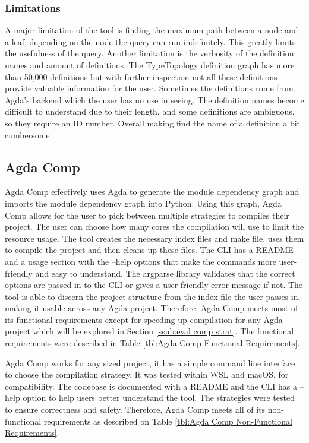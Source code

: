 \subsubsection{Limitations}

A major limitation of the tool is finding the maximum path between a node and a
leaf, depending on the node the query can run indefinitely. This greatly limits
the usefulness of the query. Another limitation is the verbosity of the
definition names and amount of definitions. The TypeTopology definition graph
has more than 50,000 definitions but with further inspection not all these
definitions provide valuable information for the user. Sometimes the
definitions come from Agda's backend which the user has no use in seeing. The
definition names become difficult to understand due to their length, and some
definitions are ambiguous, so they require an ID number. Overall making find
the name of a definition a bit cumbersome.


\subsection{Agda Comp} \label{sub:eval agda comp}

Agda Comp effectively uses Agda to generate the module dependency graph and
imports the module dependency graph into Python. Using this graph, Agda Comp
allows for the user to pick between multiple strategies to compiles their
project. The user can choose how many cores the compilation will use to limit
the resource usage. The tool creates the necessary index files and make file,
uses them to compile the project and then cleans up these files. The CLI has a
README and a usage section with the \textsf{--help} options that make the
commands more user-friendly and easy to understand. The argparse library
validates that the correct options are passed in to the CLI or gives a
user-friendly error message if not. The tool is able to discern the project
structure from the index file the user passes in, making it usable across any
Agda project. Therefore, Agda Comp meets most of its functional requirements
except for speeding up compilation for any Agda project which will be explored
in Section \ref{ssub:eval comp strat}.  The functional requirements were
described in Table \ref{tbl:Agda Comp Functional Requirements}.

Agda Comp works for any sized project, it has a simple command line interface
to choose the compilation strategy. It was tested within WSL and macOS, for
compatibility. The codebase is documented with a README and the CLI has a
\textsf{--help} option to help users better understand the tool. The strategies
were tested to ensure correctness and safety. Therefore, Agda Comp meets all of
its non-functional requirements as described on Table \ref{tbl:Agda Comp
Non-Functional Requirements}.

